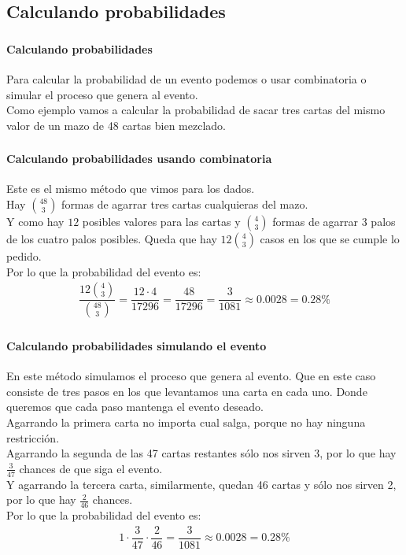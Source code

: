 \documentclass{beamer}
\begin{document}
\subsection{Calculando probabilidades}

\begin{frame}
  \frametitle{\SECTIONA}
  \framesubtitle{Calculando probabilidades}

  Para calcular la probabilidad de un evento podemos o usar combinatoria o simular el proceso que genera al evento. \pause \\
  Como ejemplo vamos a calcular la probabilidad de sacar tres cartas del mismo valor de un mazo de 48 cartas bien mezclado.
\end{frame}

\begin{frame}
  \frametitle{\SECTIONA}
  \framesubtitle{Calculando probabilidades usando combinatoria}

  Este es el mismo método que vimos para los dados. \pause \\
  Hay \(\binom{48}{3}\) formas de agarrar tres cartas cualquieras del mazo. \pause \\
  Y como hay \(12\) posibles valores para las cartas y \(\binom{4}{3}\) formas de agarrar 3 palos de los cuatro palos posibles. Queda que hay \(12\binom{4}{3}\) casos en los que se cumple lo pedido. \pause \\
  Por lo que la probabilidad del evento es:
  \begin{gather*}
    \dfrac{12\binom{4}{3}}{\binom{48}{3}} = \dfrac{12 \cdot 4}{17296} = \dfrac{48}{17296} = \dfrac{3}{1081} \approx 0.0028 = 0.28\%
  \end{gather*}
\end{frame}

\begin{frame}
  \frametitle{\SECTIONA}
  \framesubtitle{Calculando probabilidades simulando el evento}

  En este método simulamos el proceso que genera al evento. \pause Que en este caso consiste de tres pasos en los que levantamos una carta en cada uno. Donde queremos que cada paso mantenga el evento deseado. \pause \\
  Agarrando la primera carta no importa cual salga, porque no hay ninguna restricción. \pause \\
  Agarrando la segunda de las 47 cartas restantes sólo nos sirven 3, por lo que hay \(\frac{3}{47}\) chances de que siga el evento. \pause \\
  Y agarrando la tercera carta, similarmente, quedan 46 cartas y sólo nos sirven 2, por lo que hay \(\frac{2}{46}\) chances. \pause \\ Por lo que la probabilidad del evento es:
  \begin{gather*}
    1 \cdot \dfrac{3}{47} \cdot \dfrac{2}{46} = \dfrac{3}{1081} \approx 0.0028 = 0.28\%
  \end{gather*}
\end{frame}
\end{document}

